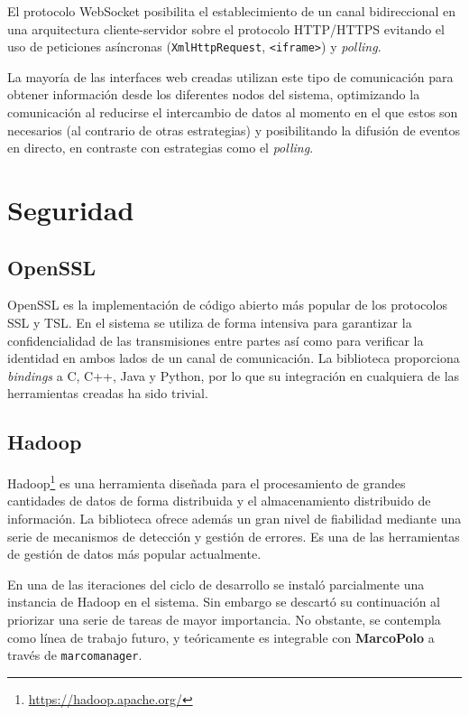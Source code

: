 El protocolo WebSocket \cite{rfc6455} posibilita el establecimiento de un canal bidireccional en una arquitectura cliente-servidor sobre el protocolo HTTP/HTTPS evitando el uso de peticiones asíncronas (\texttt{XmlHttpRequest}, \texttt{<iframe>}) y \textit{polling}.

La mayoría de las interfaces web creadas utilizan este tipo de comunicación para obtener información desde los diferentes nodos del sistema, optimizando la comunicación al reducirse el intercambio de datos al momento en el que estos son necesarios (al contrario de otras estrategias) y posibilitando la difusión de eventos en directo, en contraste con estrategias como el \textit{polling}.

\section{Seguridad}

\subsection{OpenSSL}

OpenSSL es la implementación de código abierto más popular de los protocolos SSL y TSL. En el sistema se utiliza de forma intensiva para garantizar la confidencialidad de las transmisiones entre partes así como para verificar la identidad en ambos lados de un canal de comunicación. La biblioteca proporciona \textit{bindings} a C, C++, Java y Python, por lo que su integración en cualquiera de las herramientas creadas ha sido trivial. 

\subsection{Hadoop}

Hadoop\footnote{\href{https://hadoop.apache.org/}{https://hadoop.apache.org/}} es una herramienta diseñada para el procesamiento de grandes cantidades de datos de forma distribuida y el almacenamiento distribuido de información. La biblioteca ofrece además un gran nivel de fiabilidad mediante una serie de mecanismos de detección y gestión de errores. Es una de las herramientas de gestión de datos más popular actualmente.

En una de las iteraciones del ciclo de desarrollo se instaló parcialmente una instancia de Hadoop en el sistema. Sin embargo se descartó su continuación al priorizar una serie de tareas de mayor importancia. No obstante, se contempla como línea de trabajo futuro, y teóricamente es integrable con \textbf{MarcoPolo} a través de \texttt{marcomanager}.

